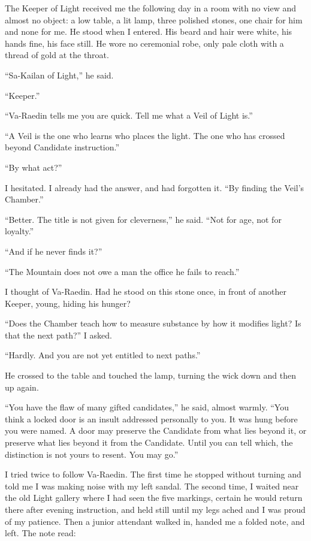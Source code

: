 The Keeper of Light received me the following day in a room with no view and almost no object: a low table, a lit lamp, three polished stones, one chair for him and none for me. He stood when I entered. His beard and hair were white, his hands fine, his face still. He wore no ceremonial robe, only pale cloth with a thread of gold at the throat.\par

``Sa-Kailan of Light,'' he said.\par
``Keeper.''\par
``Va-Raedin tells me you are quick. Tell me what a Veil of Light is.''\par
``A Veil is the one who learns who places the light. The one who has crossed beyond Candidate instruction.''\par
``By what act?''\par
I hesitated. I already had the answer, and had forgotten it. ``By finding the Veil's Chamber.''\par
``Better. The title is not given for cleverness,'' he said. ``Not for age, not for loyalty.'' \par
``And if he never finds it?''\par
``The Mountain does not owe a man the office he fails to reach.''\par

I thought of Va-Raedin. Had he stood on this stone once, in front of another Keeper, young, hiding his hunger?\par

``Does the Chamber teach how to measure substance by how it modifies light? Is that the next path?'' I asked.\par
``Hardly. And you are not yet entitled to next paths.''\par

He crossed to the table and touched the lamp, turning the wick down and then up again. \par

``You have the flaw of many gifted candidates,'' he said, almost warmly. ``You think a locked door is an insult addressed personally to you. It was hung before you were named. A door may preserve the Candidate from what lies beyond it, or preserve what lies beyond it from the Candidate. Until you can tell which, the distinction is not yours to resent. You may go.''\par

\ornament

I tried twice to follow Va-Raedin. The first time he stopped without turning and told me I was making noise with my left sandal. The second time, I waited near the old Light gallery where I had seen the five markings, certain he would return there after evening instruction, and held still until my legs ached and I was proud of my patience. Then a junior attendant walked in, handed me a folded note, and left. The note read: \par


